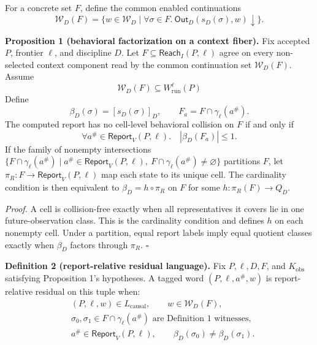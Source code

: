 \documentclass[conference]{IEEEtran}
\begin{document}
For a concrete set $F$, define the common enabled continuations
\begin{equation}
\mathcal W_D(F)
=
\{w\in\mathcal W_D\mid
\forall\sigma\in F.\
\mathsf{Out}_D(s_D(\sigma),w)\downarrow\}.
\end{equation}

\medskip
\noindent\textbf{Proposition 1 (behavioral factorization on a context fiber).}
Fix accepted $P$, frontier $\ell$, and discipline $D$. Let $F\subseteq\mathsf{Reach}_I(P,\ell)$ agree on every non-selected context component read by the common continuation set $\mathcal W_D(F)$. Assume
\begin{equation}
\mathcal W_D(F)\subseteq W^\ell_{\mathrm{run}}(P)
\end{equation}
Define
\begin{equation}
\beta_D(\sigma)=[s_D(\sigma)]_D,
\qquad
F_a=F\cap\gamma_\ell(a^\#).
\end{equation}
The computed report has no cell-level behavioral collision on $F$ if and only if
\begin{equation}
\forall a^\#\in\mathsf{Report}_V(P,\ell).\quad
|\beta_D(F_a)|\le 1.
\end{equation}
If the family of nonempty intersections
$\{F\cap\gamma_\ell(a^\#)\mid a^\#\in\mathsf{Report}_V(P,\ell),\ F\cap\gamma_\ell(a^\#)\ne\varnothing\}$
partitions $F$, let $\pi_R:F\to\mathsf{Report}_V(P,\ell)$ map each state to its unique cell. The cardinality condition is then equivalent to $\beta_D=h\circ\pi_R$ on $F$ for some $h:\pi_R(F)\to Q_D$.

\emph{Proof.} A cell is collision-free exactly when all representatives it covers lie in one future-observation class. This is the cardinality condition and defines $h$ on each nonempty cell. Under a partition, equal report labels imply equal quotient classes exactly when $\beta_D$ factors through $\pi_R$. \hfill$\square$

\medskip
\noindent\textbf{Definition 2 (report-relative residual language).}
Fix $P,\ell,D,F$, and $K_{\mathrm{obs}}$ satisfying Proposition 1's hypotheses. A tagged word $(P,\ell,a^\#,w)$ is report-relative residual on this tuple when:
\begin{equation}
\begin{aligned}
&(P,\ell,w)\in L_{\mathrm{causal}},\qquad
w\in\mathcal W_D(F),\\
&\sigma_0,\sigma_1\in F\cap\gamma_\ell(a^\#)
\text{ are Definition 1 witnesses},\\
&a^\#\in\mathsf{Report}_V(P,\ell),\qquad
\beta_D(\sigma_0)\ne\beta_D(\sigma_1).
\end{aligned}
\end{equation}
\end{document}
